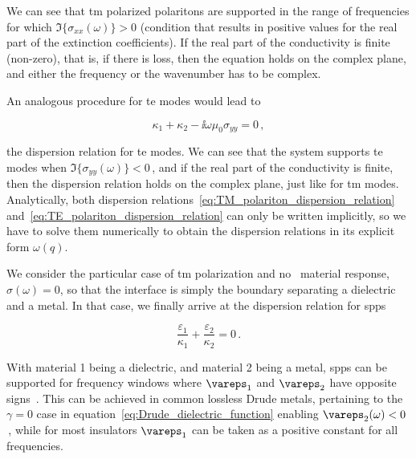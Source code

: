 We can see that \gls{tm} polarized polaritons are supported in the range of frequencies for which $\Im\{\sigma_{xx}(\omega)\} > 0$ (condition that results in positive values for the real part of the extinction coefficients).
If the real part of the conductivity is finite (non-zero), that is, if there is loss, then the equation holds on the complex plane, and either the frequency or the wavenumber has to be complex.

An analogous procedure for \gls{te} modes would lead to

\begin{equation}
    \label{eq:TE_polariton_dispersion_relation}
    \kappa_1 + \kappa_2 - \ii \omega \mu_0 \sigma_{yy} = 0\,,
\end{equation}

\noindent the dispersion relation for \gls{te} modes.
We can see that the system supports \gls{te} modes when $\Im \{\sigma_{yy}(\omega) \} < 0$\,,
and if the real part of the conductivity is finite, then the dispersion relation holds on the complex plane, just like for \gls{tm} modes.
Analytically, both dispersion relations~\eqref{eq:TM_polariton_dispersion_relation} and~\eqref{eq:TE_polariton_dispersion_relation} can only be written implicitly, so we have to solve them numerically to obtain the dispersion relations in its explicit form $\omega(q)$.

We consider the particular case of \gls{tm} polarization and no \bd~material response, $\sigma(\omega) = 0$, so that the interface is simply the boundary separating a dielectric and a metal.
In that case, we finally arrive at the dispersion relation for \gls{spp}s

\begin{equation}
    \frac{\varepsilon_1}{\kappa_1} + \frac{\varepsilon_2}{\kappa_2} = 0\,.
\end{equation}

\noindent With material 1 being a dielectric, and material 2 being a metal, \gls{spp}s can be supported for frequency windows where $\vareps_1$ and $\vareps_2$ have opposite signs~\cite{GoncalvesPeres:2016,maier_plasmonics_2007}.
This can be achieved in common lossless Drude metals, pertaining to the $\gamma=0$ case in equation~\eqref{eq:Drude_dielectric_function} enabling $\vareps_2(\omega) < 0$\,, while for most insulators $\vareps_1$ can be taken as a positive constant for all frequencies.

